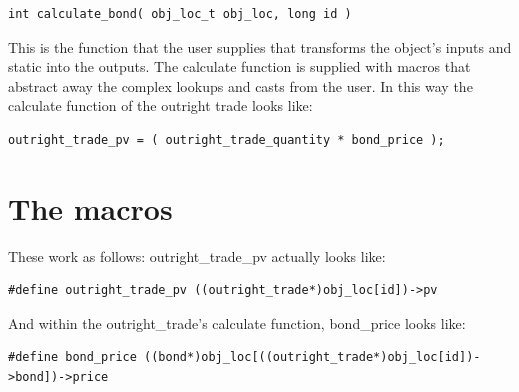 \documentclass{report}
\begin{document}
\begin{verbatim}
int calculate_bond( obj_loc_t obj_loc, long id )
\end{verbatim}

This is the function that the user supplies that transforms the object's inputs and static into the outputs.  The calculate function is supplied with macros that abstract away the complex lookups and casts from the user. In this way the calculate function of the outright trade looks like:

\begin{verbatim}
outright_trade_pv = ( outright_trade_quantity * bond_price );
\end{verbatim}


\section{The macros}

These work as follows: outright_trade_pv actually looks like:

\begin{verbatim}
#define outright_trade_pv ((outright_trade*)obj_loc[id])->pv
\end{verbatim}

And within the outright_trade's calculate function, bond_price looks like:

\begin{verbatim}
#define bond_price ((bond*)obj_loc[((outright_trade*)obj_loc[id])->bond])->price
\end{verbatim}
\end{document}
